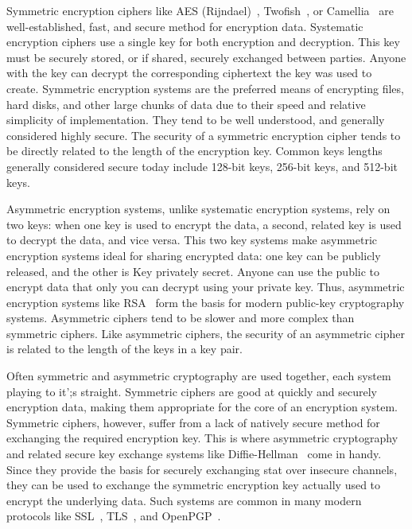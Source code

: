 Symmetric encryption ciphers like AES (Rijndael)~\cite{Daemen1999},
Twofish~\cite{Schneier1998}, or Camellia~\cite{Matsui2004} are
well-established, fast, and secure method for encryption
data. Systematic encryption ciphers use a single key for both
encryption and decryption. This key must be securely stored, or if
shared, securely exchanged between parties. Anyone with the key can
decrypt the corresponding ciphertext the key was used to
create. Symmetric encryption systems are the preferred means of
encrypting files, hard disks, and other large chunks of data due to
their speed and relative simplicity of implementation. They tend to be
well understood, and generally considered highly secure. The security
of a symmetric encryption cipher tends to be directly related to the
length of the encryption key. Common keys lengths generally considered
secure today include 128-bit keys, 256-bit keys, and 512-bit keys.

Asymmetric encryption systems, unlike systematic encryption systems,
rely on two keys: when one key is used to encrypt the data, a second,
related key is used to decrypt the data, and vice versa. This two key
systems make asymmetric encryption systems ideal for sharing encrypted
data: one key can be publicly released, and the other is Key privately
secret. Anyone can use the public to encrypt data that only you can
decrypt using your private key. Thus, asymmetric encryption systems
like RSA~\cite{Rivest1978} form the basis for modern public-key
cryptography systems. Asymmetric ciphers tend to be slower and more
complex than symmetric ciphers. Like asymmetric ciphers, the security
of an asymmetric cipher is related to the length of the keys in a key
pair.

Often symmetric and asymmetric cryptography are used together, each
system playing to it';s straight. Symmetric ciphers are good at
quickly and securely encryption data, making them appropriate for the
core of an encryption system. Symmetric ciphers, however, suffer from
a lack of natively secure method for exchanging the required
encryption key. This is where asymmetric cryptography and related
secure key exchange systems like Diffie-Hellman~\cite{Diffie1976} come
in handy. Since they provide the basis for securely exchanging stat
over insecure channels, they can be used to exchange the symmetric
encryption key actually used to encrypt the underlying data. Such
systems are common in many modern protocols like
SSL~\cite{Freier2011}, TLS~\cite{Dierks2008}, and
OpenPGP~\cite{Callas2007}.

